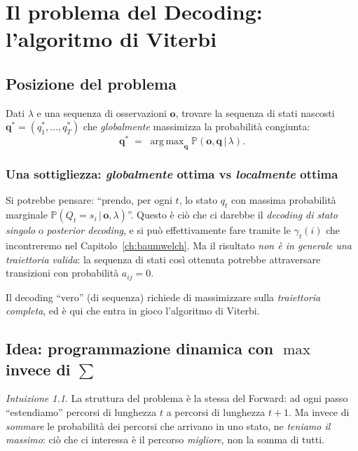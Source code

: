 \documentclass[11pt,a4paper,oneside]{book}
\theoremstyle{plain}
\theoremstyle{definition}
\theoremstyle{remark}
\newtheorem*{intuizione}{Intuizione}
\newcommand{\Prob}{\mathbb{P}}
\newcommand{\hmm}{\lambda}                   %
\newcommand{\Tlen}{T}                        %
\newcommand{\seqobs}{\mathbf{o}}             %
\newcommand{\seqstates}{\mathbf{q}}          %
\newcommand{\gam}{\gamma}                    %
\DeclareMathOperator*{\argmax}{arg\,max}
\newcommand{\given}{\,\vert\,}
\begin{document}
\chapter{Il problema del Decoding: l'algoritmo di Viterbi}
\label{ch:viterbi}

\section{Posizione del problema}

\begin{tcolorbox}[notebox,title=Problema 2 -- Decoding (Most Probable Path)]
Dati $\hmm$ e una sequenza di osservazioni $\seqobs$, trovare la
sequenza di stati nascosti $\seqstates^*=(q_1^*,\dots,q_{\Tlen}^*)$ che
\emph{globalmente} massimizza la probabilità congiunta:
\[
    \seqstates^* \;=\; \argmax_{\seqstates}\Prob(\seqobs,\seqstates\given\hmm).
\]
\end{tcolorbox}

\subsection{Una sottigliezza: \emph{globalmente} ottima vs
\emph{localmente} ottima}

Si potrebbe pensare: ``prendo, per ogni $t$, lo stato $q_t$ con
massima probabilità marginale $\Prob(Q_t=s_i\given\seqobs,\hmm)$''.
Questo è ciò che ci darebbe il \emph{decoding di stato singolo} o
\emph{posterior decoding}, e si può effettivamente fare tramite le
$\gam_t(i)$ che incontreremo nel Capitolo~\ref{ch:baumwelch}. Ma il
risultato \emph{non è in generale una traiettoria valida}: la
sequenza di stati così ottenuta potrebbe attraversare transizioni
con probabilità $a_{ij}=0$.

Il decoding ``vero'' (di sequenza) richiede di massimizzare sulla
\emph{traiettoria completa}, ed è qui che entra in gioco l'algoritmo
di Viterbi.

\section{Idea: programmazione dinamica con \texorpdfstring{$\max$}{max}
invece di \texorpdfstring{$\sum$}{sum}}

\begin{intuizione}
La struttura del problema è la stessa del Forward: ad ogni passo
``estendiamo'' percorsi di lunghezza $t$ a percorsi di lunghezza
$t+1$. Ma invece di \emph{sommare} le probabilità dei percorsi che
arrivano in uno stato, ne \emph{teniamo il massimo}: ciò che ci
interessa è il percorso \emph{migliore}, non la somma di tutti.
\end{intuizione}
\end{document}
